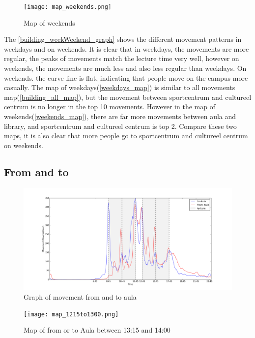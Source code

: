 \begin{figure}[H]
	\centering
	\texttt{[image: map\_weekends.png]}
	\captionsetup{justification=centering}
	\caption{Map of weekends}
	\label{weekends_map}
\end{figure}
The \autoref{building_weekWeekend_graph} shows the different movement patterns in weekdays and on weekends. It is clear that in weekdays, the movements are more regular, the peaks of movements match the lecture time very well, however on weekends, the movements are much less and also less regular than weekdays. On weekends. the curve line is flat, indicating that people move on the campus more casually.
The map of weekdays(\autoref{weekdays_map}) is similar to all movements map(\autoref{building_all_map}), but the movement between sportcentrum and cultureel centrum is no longer in the top 10 movements. However in the map of weekends(\autoref{weekends_map}), there are far more movements between aula and library, and sportcentrum and cultureel centrum is top 2. Compare these two maps, it is also clear that more people go to sportcentrum and cultureel centrum on weekends.

\subsection{From and to}\label{chapter9fromto}
\begin{figure}[H]
	\centering
	\includegraphics[scale=0.3]{building_fromTo_aulaGraph.png}
	\captionsetup{justification=centering}
	\caption{Graph of movement from and to aula}
	\label{building_weekWeekend_graph}
\end{figure}


\begin{figure}[H]
	\centering
	\texttt{[image: map\_1215to1300.png]}
	\captionsetup{justification=centering}
	\caption{Map of from or to Aula between 13:15 and 14:00}
	\label{12151300_map}
\end{figure}

